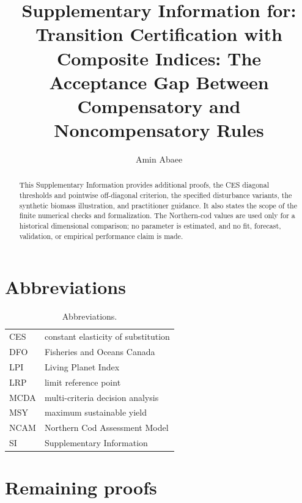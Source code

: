 \documentclass[preprint,11pt,authoryear]{elsarticle}
\theoremstyle{remark}
\begin{document}
\begin{frontmatter}
\title{Supplementary Information for:\\ Transition Certification with Composite Indices: The Acceptance Gap Between Compensatory and Noncompensatory Rules}
\author[1]{Amin Abaee}
\begin{abstract}
This Supplementary Information provides additional proofs, the CES diagonal thresholds and pointwise off-diagonal criterion, the specified disturbance variants, the synthetic biomass illustration, and practitioner guidance. It also states the scope of the finite numerical checks and formalization. The Northern-cod values are used only for a historical dimensional comparison; no parameter is estimated, and no fit, forecast, validation, or empirical performance claim is made.
\end{abstract}
\end{frontmatter}

\section{Abbreviations}

\begin{table}[!htbp]
\centering\small
\caption{Abbreviations.}
\begin{tabular}{@{}ll@{}}
\toprule
CES & constant elasticity of substitution \\
DFO & Fisheries and Oceans Canada \\
LPI & Living Planet Index \\
LRP & limit reference point \\
MCDA & multi-criteria decision analysis \\
MSY & maximum sustainable yield \\
NCAM & Northern Cod Assessment Model \\
SI & Supplementary Information \\
\bottomrule
\end{tabular}
\end{table}

\section{Remaining proofs}\label{si:proofs}
\end{document}
